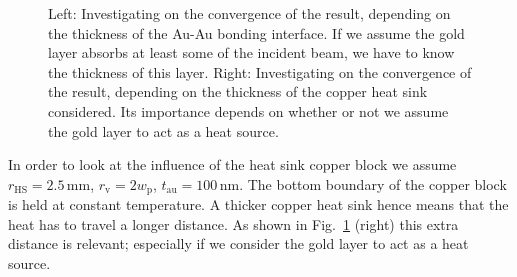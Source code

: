 \begin{figure}
\centering
{}
\caption{Left: Investigating on the convergence of the result,
depending on the thickness of the Au-Au bonding interface.
If we assume the gold layer
absorbs at least some of the incident beam,
we have to know the thickness of this layer.
Right: Investigating on the convergence of the result,
depending on the thickness of the copper heat sink considered.
Its importance depends on whether or not
we assume the gold layer to act as a heat source.}
\label{img:t_au-t_HS-vs-dT}
\end{figure}

In order to look at the influence of
the heat sink copper block
we assume
$r_\mathrm{HS}=2.5\,\mathrm{mm}$,
$r_\mathrm{v}=2w_\mathrm{p}$,
$t_\mathrm{au}=100\,\mathrm{nm}$.
The bottom boundary of the copper block
is held at constant temperature.
A thicker copper heat sink hence means
that the heat has to travel a longer distance.
As shown in Fig.~\ref{img:t_au-t_HS-vs-dT} (right)
this extra distance is relevant;
especially if we consider the gold layer
to act as a heat source.

